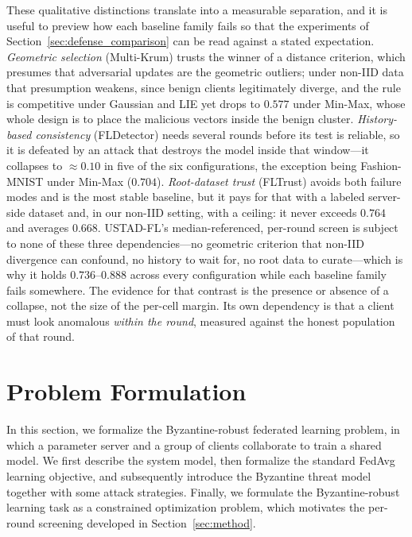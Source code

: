 \documentclass[journal]{IEEEtran}
\begin{document}
These qualitative distinctions translate into a measurable separation, and it is useful to preview how each baseline family fails so that the experiments of Section~\ref{sec:defense_comparison} can be read against a stated expectation. \emph{Geometric selection} (Multi-Krum) trusts the winner of a distance criterion, which presumes that adversarial updates are the geometric outliers; under non-IID data that presumption weakens, since benign clients legitimately diverge, and the rule is competitive under Gaussian and LIE yet drops to $0.577$ under Min-Max, whose whole design is to place the malicious vectors inside the benign cluster. \emph{History-based consistency} (FLDetector) needs several rounds before its test is reliable, so it is defeated by an attack that destroys the model inside that window---it collapses to $\approx0.10$ in five of the six configurations, the exception being Fashion-MNIST under Min-Max ($0.704$). \emph{Root-dataset trust} (FLTrust) avoids both failure modes and is the most stable baseline, but it pays for that with a labeled server-side dataset and, in our non-IID setting, with a ceiling: it never exceeds $0.764$ and averages $0.668$. USTAD-FL's median-referenced, per-round screen is subject to none of these three dependencies---no geometric criterion that non-IID divergence can confound, no history to wait for, no root data to curate---which is why it holds $0.736$--$0.888$ across every configuration while each baseline family fails somewhere. The evidence for that contrast is the presence or absence of a collapse, not the size of the per-cell margin. Its own dependency is that a client must look anomalous \emph{within the round}, measured against the honest population of that round.

\section{Problem Formulation}
\label{sec:formulation}

In this section, we formalize the Byzantine-robust federated learning problem, in which a parameter server and a group of clients collaborate to train a shared model. We first describe the system model, then formalize the standard FedAvg learning objective, and subsequently introduce the Byzantine threat model together with some attack strategies. Finally, we formulate the Byzantine-robust learning task as a constrained optimization problem, which motivates the per-round screening developed in Section~\ref{sec:method}.
\end{document}
